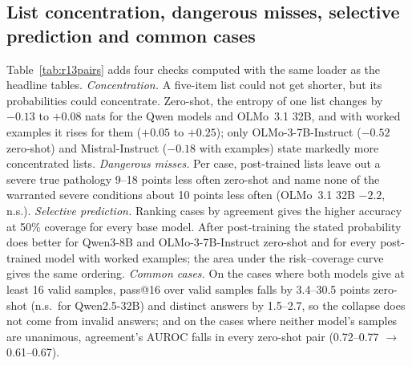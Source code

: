 \documentclass[wcp]{jmlr}
\begin{document}
\subsection{List concentration, dangerous misses, selective prediction and common cases}\label{sec:joint}
Table~\ref{tab:r13pairs} adds four checks computed with the same loader as the headline tables. \emph{Concentration.} A five-item list could not get shorter, but its probabilities could concentrate. Zero-shot, the entropy of one list changes by $-0.13$ to $+0.08$ nats for the Qwen models and OLMo~3.1 32B, and with worked examples it rises for them ($+0.05$ to $+0.25$); only OLMo-3-7B-Instruct ($-0.52$ zero-shot) and Mistral-Instruct ($-0.18$ with examples) state markedly more concentrated lists. \emph{Dangerous misses.} Per case, post-trained lists leave out a severe true pathology 9--18 points less often zero-shot and name none of the warranted severe conditions about 10 points less often (OLMo~3.1 32B $-2.2$, n.s.). \emph{Selective prediction.} Ranking cases by agreement gives the higher accuracy at 50\% coverage for every base model. After post-training the stated probability does better for Qwen3-8B and OLMo-3-7B-Instruct zero-shot and for every post-trained model with worked examples; the area under the risk--coverage curve gives the same ordering. \emph{Common cases.} On the cases where both models give at least 16 valid samples, pass@16 over valid samples falls by 3.4--30.5 points zero-shot (n.s.\ for Qwen2.5-32B) and distinct answers by 1.5--2.7, so the collapse does not come from invalid answers; and on the cases where neither model's samples are unanimous, agreement's AUROC falls in every zero-shot pair (0.72--0.77 $\rightarrow$ 0.61--0.67).
\end{document}
